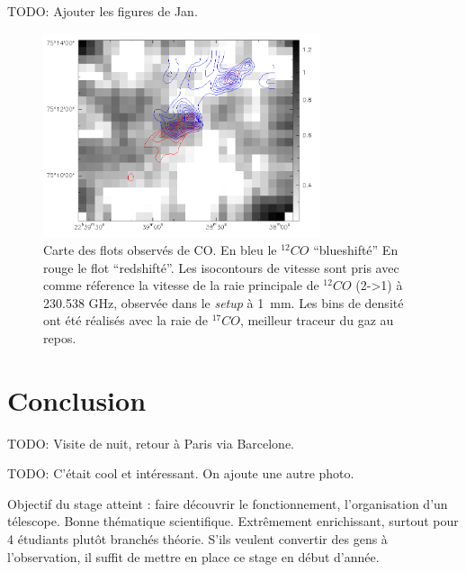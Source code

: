 \documentclass[a4paper,10pt,french]{article}
\newcommand{\setup}{\textit{setup}}
\newcommand{\unmm}{\SI{1}{\milli\meter}}
\begin{document}
TODO: Ajouter les figures de Jan.

\begin{figure}[h!]
\centering
\includegraphics[height=6cm]{figures/mapC17O.png}
\caption{Carte des flots observés de CO. En bleu le $^{12}CO$ ``blueshifté'' En
    rouge le flot ``redshifté''. Les isocontours de vitesse sont pris avec
    comme réference la vitesse de la raie principale de $^{12}CO$ (2->1) à
    230.538 GHz, observée dans le \setup{} à \unmm. Les bins de densité ont été
    réalisés avec la raie de $^{17}CO$, meilleur traceur du gaz au repos.}
\label{mapC17O}
\end{figure}

\section*{Conclusion}

TODO: Visite de nuit, retour à Paris via Barcelone.

TODO: C’était cool et intéressant. On ajoute une autre photo.

Objectif du stage atteint : faire découvrir le fonctionnement, l'organisation d'un télescope. Bonne thématique scientifique.
Extrêmement enrichissant, surtout pour 4 étudiants plutôt branchés théorie. S'ils veulent convertir des gens à l'observation, il suffit de mettre en place ce stage en début d'année.
\end{document}
